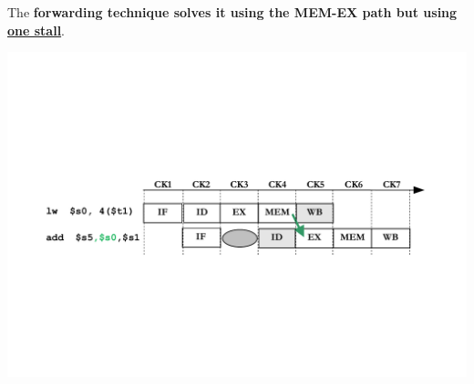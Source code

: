 \documentclass[a4paper]{article}
\begin{document}
\begin{itemize}
\begin{examplebox}
            The \textbf{forwarding technique solves it using the MEM-EX path but using \underline{one stall}}.
            \begin{center}
                \includegraphics[width=\textwidth]{img/load-use-hazard-problem-2.pdf}
            \end{center}
        \end{examplebox}


\end{itemize}
\end{document}
